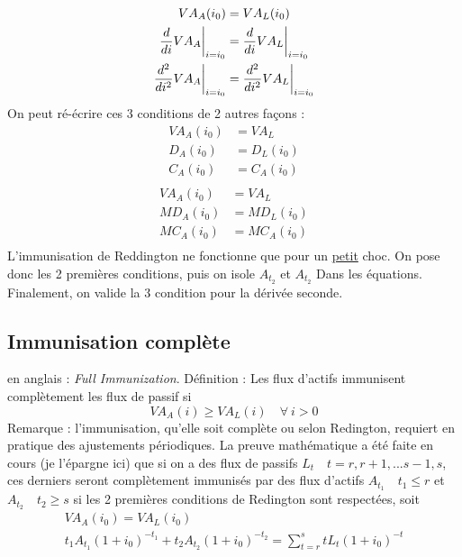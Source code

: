 \documentclass[12pt, french]{report}
\begin{document}
\begin{align}
	VA_A(i_0) 										& = VA_L(i_0) \\
	\frac{d}{di} VA_A	\biggr \rvert_{i=i_0}			& = \frac{d}{di} VA_L \biggr \rvert_{i = i_0} \\
	\frac{d^2}{di^2} VA_A \biggr \rvert_{i=i_0}		& = \frac{d^2}{di^2} VA_L \biggr \rvert_{i=i_0} \\
\end{align}
On peut ré-écrire ces 3 conditions de 2 autres façons :
\begin{align}
	VA_A(i_0) 				& = VA_L \\
	D_A(i_0)					& = D_L(i_0) \\
	C_A(i_0)					& = C_A(i_0) \\
\end{align}
\begin{align}
	VA_A(i_0) 				& = VA_L \\
	MD_A(i_0)					& = MD_L(i_0) \\
	MC_A(i_0)					& = MC_A(i_0) \\
\end{align}
\bcattention L'immunisation de Reddington ne fonctionne que pour un \underline{petit} choc.
\p
On pose donc les 2 premières conditions, puis on isole $A_{t_2}$ et $A_{t_2}$ Dans
les équations. Finalement, on valide la 3 condition pour la dérivée seconde.

\subsection{Immunisation complète}
\label{subsec:immunisation_complete}
en anglais : \emph{Full Immunization}.
\p
Définition : Les flux d'actifs immunisent complètement les flux de passif si
\begin{equation}
	VA_A(i) \ge VA_L(i) \quad \forall\ i >0
\end{equation}
\p
Remarque : l'immunisation, qu'elle soit complète ou selon Redington, requiert en
pratique des ajustements périodiques.
\p
La preuve mathématique a été faite en cours (je l'épargne ici) que si on a des
flux de passifs $L_t \quad t = r,r+1,...s-1,s$, ces derniers seront complètement
immunisés par des flux d'actifs $A_{t_1} \quad t_1 \le r$ et $A_{t_2} \quad t_2 \ge s$
si les 2 premières conditions de Redington sont respectées, soit
\begin{gather*}
	VA_A(i_0) = VA_L(i_0) \\
	t_1 A_{t_1}(1+i_0)^{-t_1} + t_2 A_{t_2} (1+i_0)^{-t_2} = \sum_{t=r}^s t L_t (1+i_0)^{-t} \\
\end{gather*}
\end{document}
